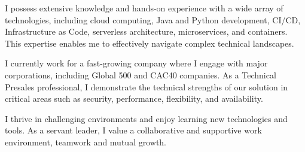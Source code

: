 

\begin{cvparagraph}

I possess extensive knowledge and hands-on experience with a wide array of technologies, including cloud computing, Java and Python development, CI/CD, Infrastructure as Code, serverless architecture, microservices, and containers. This expertise enables me to effectively navigate complex technical landscapes.

I currently work for a fast-growing company where I engage with major corporations, including Global 500 and CAC40 companies. As a Technical Presales professional, I demonstrate the technical strengths of our solution in critical areas such as security, performance, flexibility, and availability.

I thrive in challenging environments and enjoy learning new technologies and tools. As a servant leader, I value a collaborative and supportive work environment, teamwork and mutual growth.
\end{cvparagraph}
